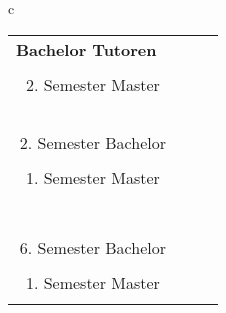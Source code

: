   \begin{tabular}{c}
\begin{tabular}{ccc}
  { \textbf{Bachelor Tutoren}} \ \\ 
{
\npicture[0.3\linewidth]
{bilder/tutoren/dominik.jpg}
{Dominik\\2. Semester Master\\ \randomize{d.schuermann@tu-bs.de}}
}%
& \ 
{\npicture[0.3\linewidth]
{bilder/tutoren/keno.jpg}
{Keno\\2. Semester Bachelor\\ \randomize{k.garlichs@tu-braunschweig.de}}
}
&
{
\npicture[0.3\linewidth]
{bilder/tutoren/hella.jpg}
{Hella\\ 1. Semester Master\\ \randomize{h-f.hoffmann@tu-bs.de}}}
 \\ \  \\
{\npicture[0.3\linewidth]
{bilder/tutoren/johannes.jpg}
{Johannes\\ 6. Semester Bachelor\\ \randomize{J.Starosta@tu-bs.de}}
}%
&{
\npicture[0.3\linewidth]%
{bilder/tutoren/serj}
{Serj\\ 1. Semester Master\\\randomize{s.dechand@tu-bs.de }}}

\end{tabular}
\end{tabular}
